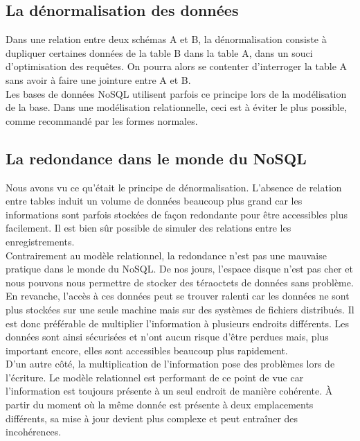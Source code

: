 \subsection{La dénormalisation des données}
	Dans une relation entre deux schémas A et B, la dénormalisation consiste à dupliquer certaines données de la table B dans la table A, dans un souci d'optimisation des requêtes. On pourra alors se contenter d'interroger la table A sans avoir à faire une jointure entre A et B.\\

	Les bases de données NoSQL utilisent parfois ce principe lors de la modélisation de la base. Dans une modélisation relationnelle, ceci est à éviter le plus possible, comme recommandé par les formes normales.

\subsection{La redondance dans le monde du NoSQL}
\label{subsec:redondanceNoSQL}
	Nous avons vu ce qu'était le principe de dénormalisation. L'absence de relation entre tables induit un volume de données beaucoup plus grand car les informations sont parfois stockées de façon redondante pour être accessibles plus facilement. Il est bien sûr possible de simuler des relations entre les enregistrements.\\

	Contrairement au modèle relationnel, la redondance n'est pas une mauvaise pratique dans le monde du NoSQL. De nos jours, l'espace disque n'est pas cher et nous pouvons nous permettre de stocker des téraoctets de données sans problème. En revanche, l'accès à ces données peut se trouver ralenti car les données ne sont plus stockées sur une seule machine mais sur des systèmes de fichiers distribués. Il est donc préférable de multiplier l'information à plusieurs endroits différents. Les données sont ainsi sécurisées et n'ont aucun risque d'être perdues mais, plus important encore, elles sont accessibles beaucoup plus rapidement.\\

	D'un autre côté, la multiplication de l'information pose des problèmes lors de l'écriture. Le modèle relationnel est performant de ce point de vue car l'information est toujours présente à un seul endroit de manière cohérente. À partir du moment où la même donnée est présente à deux emplacements différents, sa mise à jour devient plus complexe et peut entraîner des incohérences.\\

